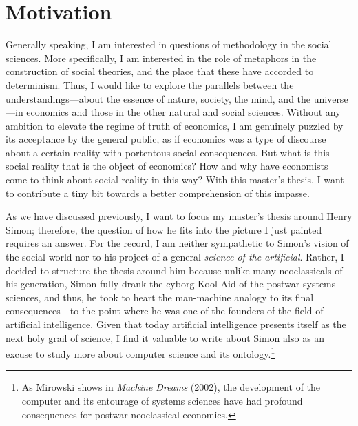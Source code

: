 \documentclass[draft=false, paper=A4,portrait,twoside=true,twocolumn=false,headinclude=false,footinclude=false,fontsize=11,BCOR=15mm,DIV=calc,pagesize=auto,titlepage=firstiscover,mpinclude=true,headings=big,headings=twolinechapter,open=right,chapterprefix=false,headsepline=false,parskip=full]{scrbook}
\begin{document}
\section{Motivation}
\label{sec:org33ec881}
Generally speaking, I am interested in questions of methodology in the
social sciences. More specifically, I am interested in the role of
metaphors in the construction of social theories, and the place that these
have accorded to determinism. Thus, I would like to explore the parallels
between the understandings---about the essence of nature, society, the
mind, and the universe---in economics and those in the other natural and
social sciences. Without any ambition to elevate the regime of truth of
economics, I am genuinely puzzled by its acceptance by the general public,
as if economics was a type of discourse about a certain reality with
portentous social consequences. But what is this social reality that is the
object of economics? How and why have economists come to think about social
reality in this way? With this master's thesis, I want to contribute a tiny
bit towards a better comprehension of this impasse.

As we have discussed previously, I want to focus my master's thesis around
Henry Simon; therefore, the question of how he fits into the picture I just
painted requires an answer. For the record, I am neither sympathetic to
Simon's vision of the social world nor to his project of a general \emph{science
of the artificial}. Rather, I decided to structure the thesis around him
because unlike many neoclassicals of his generation, Simon fully drank the
cyborg Kool-Aid of the postwar systems sciences, and thus, he took to heart
the man-machine analogy to its final consequences---to the point where he
was one of the founders of the field of artificial intelligence. Given that
today artificial intelligence presents itself as the next holy grail of
science, I find it valuable to write about Simon also as an excuse to study
more about computer science and its ontology.\footnote{As Mirowski shows in \emph{Machine Dreams} (2002), the development of the
computer and its entourage of systems sciences have had profound
consequences for postwar neoclassical economics.} 
\end{document}
